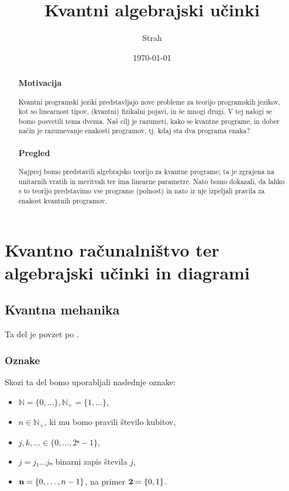 \documentclass[a4paper,slovene]{article}
\title{Kvantni algebrajski učinki}
\author{Strah}
\date{\today}
\begin{document}
\maketitle

\begin{abstract}
    \subsubsection*{Motivacija} %

    Kvantni programski jeziki predstavljajo nove probleme za teorijo programskih jezikov,
    kot so linearnost tipov, (kvantni) fizikalni pojavi, in še mnogi drugi.
    V tej nalogi se bomo posvetili tema dvema.
    Naš cilj je razumeti, kako se kvantne programe,
    in dober način je razumevanje enakosti programov,
    tj. kdaj sta dva programa enaka?

    \subsubsection*{Pregled}

    Najprej bomo predstavili algebrajsko teorijo za kvantne programe;
    ta je zgrajena na unitarnih vratih in meritvah ter ima linearne parametre.
    Nato bomo dokazali, da lahko s to teorijo predstavimo vse programe (polnost)
    in nato iz nje izpeljali pravila za enakost kvantnih programov.

\end{abstract}

\section{Kvantno računalništvo ter algebrajski učinki in diagrami}

\subsection{Kvantna mehanika}
Ta del je povzet po \cite{ess-qc}.

\subsubsection*{Oznake}
Skozi ta del bomo uporabljali naslednje oznake:
\begin{itemize}
    \item \( ℕ = \{ 0, \dots \}, ℕ_+ = \{ 1, \dots \} \),
    \item \( n \in ℕ_+ \), ki mu bomo pravili število kubitov,
    \item \( j, k, \dots \in \{ 0, \dots, 2ⁿ - 1 \} \),
    \item \( j = j₁ \dots jₙ \) binarni zapis števila \( j \),
    \item \( \mathbf{n} = \{ 0, \dots, n-1 \} \), na primer \( \mathbf{2} = \{ 0, 1 \} \).
\end{itemize}
\end{document}
